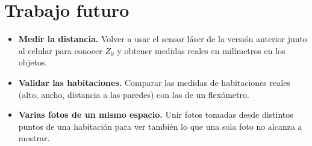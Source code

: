 \section{Trabajo futuro}

\begin{itemize}
  \item \textbf{Medir la distancia.} Volver a usar el sensor láser de la
        versión anterior junto al celular para conocer $Z_0$ y obtener medidas
        reales en milímetros en los objetos.
  \item \textbf{Validar las habitaciones.} Comparar las medidas de
        habitaciones reales (alto, ancho, distancia a las paredes) con las de
        un flexómetro.
  \item \textbf{Varias fotos de un mismo espacio.} Unir fotos tomadas desde
        distintos puntos de una habitación para ver también lo que una sola
        foto no alcanza a mostrar.
\end{itemize}
